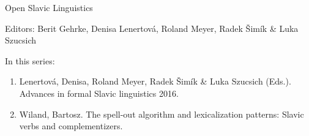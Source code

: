 {\large Open Slavic Linguistics}

\bigskip

Editors: Berit Gehrke,
         Denisa Lenertová, 
         Roland Meyer, 
         Radek Šimík \&  
         Luka Szucsich

\bigskip

In this series:

\begin{enumerate}
\item Lenertová, Denisa, Roland Meyer, Radek Šimík \& Luka Szucsich (Eds.). Advances in formal Slavic linguistics 2016.
\item Wiland, Bartosz. The spell-out algorithm and lexicalization patterns: Slavic verbs and complementizers.
\end{enumerate}
